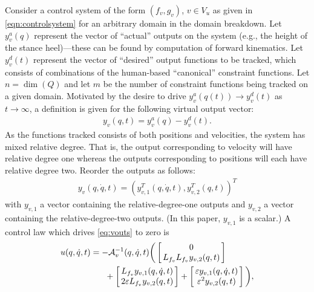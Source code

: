 
Consider a control system of the form $(f_{v},g_{v})$, $v \in V_{u}$ as given in \eqref{eqn:controlsystem} for an arbitrary domain in the domain breakdown. Let $y^{a}_{v}(q)$ represent the vector of ``actual'' outputs on the system (e.g., the height of the stance heel)---these can be found by computation of forward kinematics.\cite{MLS94}\xspace Let $y^{d}_{v}(t)$ represent the vector of ``desired'' output functions to be tracked, which consists of combinations of the human-based ``canonical'' constraint functions. Let $n = \dim(Q)$ and let $m$ be the number of constraint functions being tracked on a given domain. Motivated by the desire to drive $y^{a}_{v}(q(t)) \to y^{d}_{v}(t)$ as $t \to \infty$, a definition is given for the following virtual output vector:
\begin{align}
  \label{eq:virtout}
  y_v(q,t) = y^a_v(q) - y^d_v(t).
\end{align}
As the functions tracked consists of both positions and velocities, the system has mixed relative degree. That is, the output corresponding to velocity will have relative degree one whereas the outputs corresponding to positions will each have relative degree two. Reorder the outputs as follows:
\begin{align}
  \label{eq:vouts}
  y_v(q, {\dot q}, t) = (y_{v,1}^T(q, {\dot q}, t),y_{v,2}^T(q, t))^T
\end{align}
with $y_{v,1}$ a vector containing the relative-degree-one outputs and $y_{v,2}$ a vector containing the relative-degree-two outputs. (In this paper, $y_{v,1}$ is a scalar.) A control law which drives \eqref{eq:vouts} to zero is
\begin{align}
  \lefteqn{u(q, {\dot q}, t) = -\mathcal{A}_{v}^{-1}(q, {\dot q}, t)
  \bigg(\left[\!\!\begin{array}{c}
    0\\
    L_{f_{v}} L_{f_{v}} y_{v,2}(q, t)
    \end{array}\!\!\right]}\\
\nonumber
  &&\hspace{15mm}\mbox{}+ \left[\!\!\begin{array}{c}
        L_{f_{v}} y_{v,1}(q, {\dot q}, t)\\
        2 \varepsilon L_{f_{v}} y_{v,2}(q, t)
      \end{array}\!\!\right] +
  \left[\!\!\begin{array}{c}
    \varepsilon y_{v,1}(q, {\dot q}, t)\\
    \varepsilon^2 y_{v,2}(q, t)
    \end{array}\!\!\right]\bigg),
\end{align}
